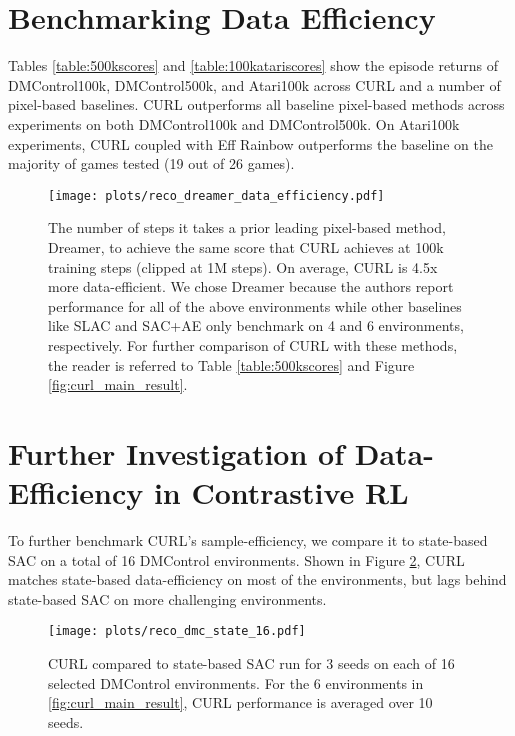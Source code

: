 \documentclass{article}
\begin{document}
\section{Benchmarking Data Efficiency}

Tables \ref{table:500kscores} and \ref{table:100katariscores} show the episode returns of DMControl100k, DMControl500k, and Atari100k across CURL and a number of pixel-based baselines. CURL outperforms all baseline pixel-based methods across experiments on both DMControl100k and DMControl500k. On Atari100k experiments, CURL coupled with Eff Rainbow outperforms the baseline on the majority of games tested (19 out of 26 games).

 \begin{figure}[h]
 \begin{center}
   \centerline{\texttt{[image: plots/reco\_dreamer\_data\_efficiency.pdf]}}
   \caption{The number of steps it takes a prior leading pixel-based method, Dreamer, to achieve the same score that CURL achieves at 100k training steps (clipped at 1M steps). On average, CURL is 4.5x more data-efficient. We chose Dreamer because the authors \cite{hafner2019dream} report performance for all of the above environments while other baselines like SLAC and SAC+AE only benchmark on 4 and 6 environments, respectively. For further comparison of CURL with these methods, the reader is referred to Table \ref{table:500kscores} and Figure \ref{fig:curl_main_result}.
   }
   \label{fig:curl_sample_efficiency}
 \end{center}
 \vskip -0.2in
 \end{figure}
 


\section{Further Investigation of Data-Efficiency in Contrastive RL}

To further benchmark CURL's sample-efficiency, we compare it to state-based SAC on a total of 16 DMControl environments. Shown in Figure \ref{fig:curl_all_dmc}, CURL matches state-based data-efficiency on most of the environments, but lags behind state-based SAC on more challenging environments.



\begin{figure}[!ht]
 \begin{center}
   \centerline{\texttt{[image: plots/reco\_dmc\_state\_16.pdf]}}
   \caption{CURL compared to state-based SAC run for 3 seeds on each of 16 selected DMControl environments. For the 6 environments in \ref{fig:curl_main_result}, CURL performance is averaged over 10 seeds.}
   \label{fig:curl_all_dmc}
 \end{center}
 \end{figure}
 
\end{document}
